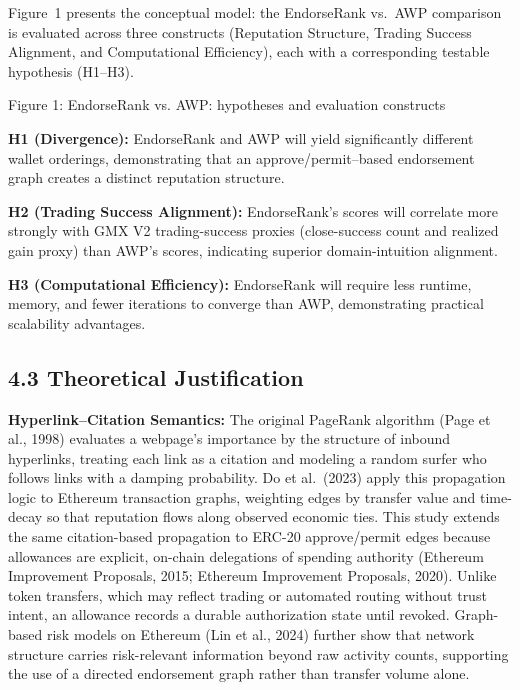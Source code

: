 Figure~1 presents the conceptual model: the EndorseRank vs.\ AWP comparison is evaluated across three constructs (Reputation Structure, Trading Success Alignment, and Computational Efficiency), each with a corresponding testable hypothesis (H1--H3).


\begin{center}


\vspace{0.4em}
Figure 1: EndorseRank vs. AWP: hypotheses and evaluation constructs
\end{center}

\textbf{H1 (Divergence): }EndorseRank and AWP will yield significantly different wallet orderings, demonstrating that an approve/permit--based endorsement graph creates a distinct reputation structure.


\textbf{H2 (Trading Success Alignment): }EndorseRank's scores will correlate more strongly with GMX V2 trading-success proxies (close-success count and realized gain proxy) than AWP's scores, indicating superior domain-intuition alignment.


\textbf{H3 (Computational Efficiency): }EndorseRank will require less runtime, memory, and fewer iterations to converge than AWP, demonstrating practical scalability advantages.


\subsection*{4.3 Theoretical Justification}
\label{sec:theoretical-justification}

\textbf{Hyperlink--Citation Semantics: }The original PageRank algorithm (Page et al., 1998) evaluates a webpage's importance by the structure of inbound hyperlinks, treating each link as a citation and modeling a random surfer who follows links with a damping probability. Do et al.\ (2023) apply this propagation logic to Ethereum transaction graphs, weighting edges by transfer value and time-decay so that reputation flows along observed economic ties. This study extends the same citation-based propagation to ERC-20 approve/permit edges because allowances are explicit, on-chain delegations of spending authority (Ethereum Improvement Proposals, 2015; Ethereum Improvement Proposals, 2020). Unlike token transfers, which may reflect trading or automated routing without trust intent, an allowance records a durable authorization state until revoked. Graph-based risk models on Ethereum (Lin et al., 2024) further show that network structure carries risk-relevant information beyond raw activity counts, supporting the use of a directed endorsement graph rather than transfer volume alone.


